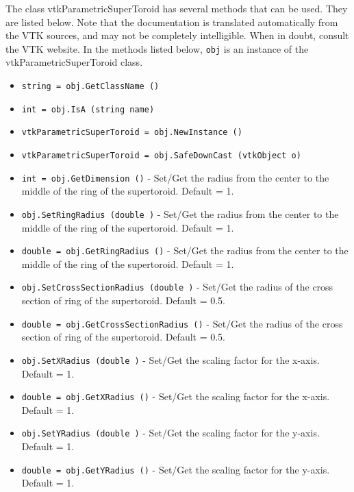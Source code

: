 The class vtkParametricSuperToroid has several methods that can be used.
  They are listed below.
Note that the documentation is translated automatically from the VTK sources,
and may not be completely intelligible.  When in doubt, consult the VTK website.
In the methods listed below, \verb|obj| is an instance of the vtkParametricSuperToroid class.
\begin{itemize}
\item  \verb|string = obj.GetClassName ()|

\item  \verb|int = obj.IsA (string name)|

\item  \verb|vtkParametricSuperToroid = obj.NewInstance ()|

\item  \verb|vtkParametricSuperToroid = obj.SafeDownCast (vtkObject o)|

\item  \verb|int = obj.GetDimension ()| -  Set/Get the radius from the center to the middle of the ring of the
 supertoroid.  Default = 1.

\item  \verb|obj.SetRingRadius (double )| -  Set/Get the radius from the center to the middle of the ring of the
 supertoroid.  Default = 1.

\item  \verb|double = obj.GetRingRadius ()| -  Set/Get the radius from the center to the middle of the ring of the
 supertoroid.  Default = 1.

\item  \verb|obj.SetCrossSectionRadius (double )| -  Set/Get the radius of the cross section of ring of the supertoroid.
 Default = 0.5.

\item  \verb|double = obj.GetCrossSectionRadius ()| -  Set/Get the radius of the cross section of ring of the supertoroid.
 Default = 0.5.

\item  \verb|obj.SetXRadius (double )| -  Set/Get the scaling factor for the x-axis. Default = 1.

\item  \verb|double = obj.GetXRadius ()| -  Set/Get the scaling factor for the x-axis. Default = 1.

\item  \verb|obj.SetYRadius (double )| -  Set/Get the scaling factor for the y-axis. Default = 1.

\item  \verb|double = obj.GetYRadius ()| -  Set/Get the scaling factor for the y-axis. Default = 1.


\end{itemize}
